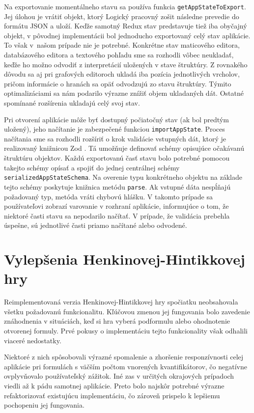 Na exportovanie momentálneho stavu sa používa funkcia \texttt{getAppStateToExport}. Jej úlohou je vrátiť objekt, ktorý Logický pracovný zošit následne prevedie do formátu JSON a uloží. Keďže samotný Redux stav predstavuje tiež iba obyčajný objekt, v pôvodnej implementácii bol jednoducho exportovaný celý stav aplikácie. To však v~našom prípade nie je potrebné. Konkrétne stav maticového editora, databázového editora a textového pohľadu sme sa rozhodli vôbec neukladať, keďže ho možno odvodiť z interpretácií uložených v stave štruktúry. Z rovnakého dôvodu sa aj pri grafových editoroch ukladá iba pozícia jednotlivých vrcholov, pričom informácie o hranách sa opäť odvodzujú zo stavu štruktúry. Týmito optimalizáciami sa nám podarilo výrazne znížiť objem ukladaných dát. Ostatné spomínané rozšírenia ukladajú celý svoj stav.

Pri otvorení aplikácie môže byť dostupný počiatočný stav (ak bol predtým uložený), jeho načítanie je zabezpečené funkciou \texttt{importAppState}. Proces načítania sme sa rozhodli rozšíriť o krok validácie vstupných dát, ktorý je realizovaný knižnicou Zod \cite{zod}. Tá umožňuje definovať schémy opisujúce očakávanú štruktúru objektov. Každú exportovanú časť stavu bolo potrebné pomocou takejto schémy opísať a spojiť do jednej centrálnej schémy \texttt{serializedAppStateSchema}. Na overenie typu konkrétneho objektu na základe tejto schémy poskytuje knižnica metódu \texttt{parse}. Ak vstupné dáta nespĺňajú požadovaný typ, metóda vráti chybovú hlášku. V takomto prípade sa používateľovi zobrazí varovanie v rozhraní aplikácie, informujúce o tom, že niektoré časti stavu sa nepodarilo načítať. V prípade, že validácia prebehla úspešne, sú jednotlivé časti priamo načítané alebo odvodené.

\section{Vylepšenia Henkinovej-Hintikkovej hry}
Reimplementovaná verzia Henkinovej-Hintikkovej hry spočiatku neobsahovala všetku požadovanú funkcionalitu. Kľúčovou zmenou jej fungovania bolo zavedenie znáhodnenia v situáciách, keď si hra vyberá podformulu alebo ohodnotenie otvorenej formuly. Prvé pokusy o implementáciu tejto funkcionality však odhalili viaceré nedostatky.

Niektoré z nich spôsobovali výrazné spomalenie a zhoršenie responzívnosti celej aplikácie pri formulách s väčším počtom vnorených kvantifikátorov, čo negatívne ovplyvňovalo používateľský zážitok. Iné zas v určitých okrajových prípadoch viedli až k pádu samotnej aplikácie. Preto bolo najskôr potrebné výrazne refaktorizovať existujúcu implementáciu, čo zároveň prispelo k lepšiemu pochopeniu jej fungovania.

